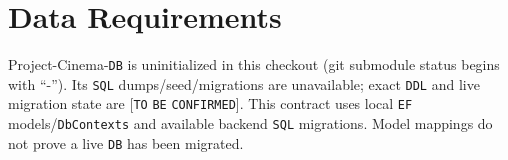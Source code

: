 \clearpage
\section{Data Requirements}\label{sec:srs-14}
Project-Cinema-\texttt{DB} is uninitialized in this checkout (git submodule status begins with “-”). Its \texttt{SQL} dumps/\allowbreak{}seed/\allowbreak{}migrations are unavailable; exact \texttt{DDL} and live migration state are [\texttt{TO} \texttt{BE} \texttt{CONFIRME\allowbreak{}D}]. This contract uses local \texttt{EF} models/\allowbreak{}\texttt{Db\allowbreak{}Contexts\allowbreak{}} and available backend \texttt{SQL} migrations. Model mappings do not prove a live \texttt{DB} has been migrated.

\begingroup
\fontsize{9.5}{12}\selectfont
\setlength{\SRSWidth}{\dimexpr\linewidth-4\tabcolsep\relax}
